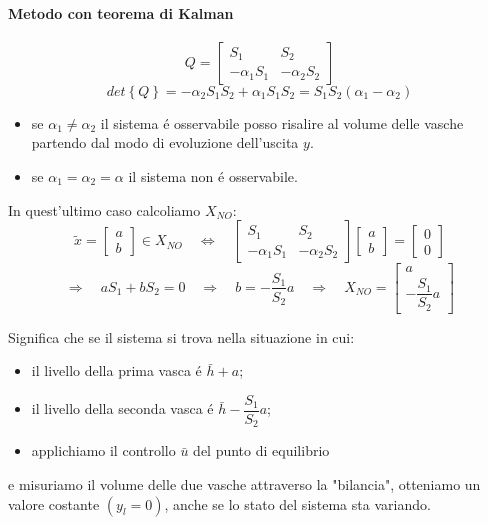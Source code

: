 \documentclass[../main.tex]{subfiles}
\begin{document}
\begin{mdframed}[style=Exercise]
\begin{Exercise}[title={Studiare l'osservabilit\'a di due vasche in parallelo}]
				\paragraph{Metodo con teorema di Kalman}
					\[
						Q =
						\begin{bmatrix}
							S_1 & S_2\\
							-\alpha_1 S_1 & -\alpha_2 S_2
						\end{bmatrix}
					\]
					\[
						det\left\lbrace Q \right\rbrace = -\alpha_2 S_1 S_2 + \alpha_1 S_1 S_2 = S_1 S_2 (\alpha_1 - \alpha_2)
					\]
					
					\begin{itemize}
						\item 
							se $ \alpha_1 \neq \alpha_2 $ il sistema \'e osservabile posso risalire al volume delle vasche partendo dal modo di evoluzione dell'uscita $ y $.
						\item 
							se $ \alpha_1 = \alpha_2 = \alpha $ il sistema non \'e osservabile.
					\end{itemize}
				
					In quest'ultimo caso calcoliamo $ X_{NO} $:
					\[
						\tilde x =
						\begin{bmatrix}
							a\\
							b
						\end{bmatrix} \in X_{NO}
						\quad\Leftrightarrow\quad 
						\begin{bmatrix}
							S_1 & S_2\\
							-\alpha_1 S_1 & -\alpha_2 S_2
						\end{bmatrix}
						\begin{bmatrix}
							a\\
							b
						\end{bmatrix} =
						\begin{bmatrix}
							0\\
							0
						\end{bmatrix}
					\]
					\[
						\Rightarrow\quad aS_1 + bS_2 = 0 \quad\Rightarrow\quad b = -\dfrac{S_1}{S_2}a \quad\Rightarrow\quad X_{NO} =
						\begin{bmatrix}
							a\\
							-\dfrac{S_1}{S_2}a
						\end{bmatrix}
					\]
					
					Significa che se il sistema si trova nella situazione in cui:
					\begin{itemize}
						\item 
							il livello della prima vasca \'e $ \bar h + a $;
						\item 
							il livello della seconda vasca \'e $ \bar h - \dfrac{S_1}{S_2}a $;
						\item 
							applichiamo il controllo $ \bar u $ del punto di equilibrio
					\end{itemize}
					e misuriamo il volume delle due vasche attraverso la "bilancia", otteniamo un valore costante $ (y_l = 0) $, anche se lo stato del sistema sta variando.
					

\end{Exercise}
\end{mdframed}
\end{document}
